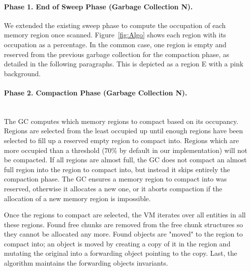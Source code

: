 \documentclass[sigplan,10pt,screen]{acmart}\settopmatter{printfolios=true,printccs=true,printacmref=true}
\newcommand{\egb}[1]{\color{blue}\fbox{\bfseries\sffamily\scriptsize Elisa:}{\sf\small$\blacktriangleright$\textit{#1}$\blacktriangleleft$}\color{black}}
\begin{document}
\paragraph{Phase 1. End of Sweep Phase (Garbage Collection N).} We extended the existing sweep phase to compute the occupation of each memory region once scanned. 
Figure~\ref{fig:Algo} shows each region with its occupation as a percentage. 
In the common case, one region is empty and reserved from the previous garbage collection for the compaction phase, as detailed in the following paragraphs. 
This is depicted as a region E with a pink background.

\paragraph{Phase 2. Compaction Phase (Garbage Collection N).} \hfill \\ 
The GC computes which memory regions to compact based on its occupancy. Regions are selected from the least occupied up until enough regions have been selected to fill up a reserved empty region to compact into. Regions which are more occupied than a threshold (70\% by default in our implementation) will not be compacted.
If all regions are almost full, the GC does not compact an almost full region into the region to compact into, but instead it skips entirely the compaction phase.
The GC ensures a memory region to compact into was reserved, otherwise it allocates a new one, or it aborts compaction if the allocation of a new memory region is impossible.

Once the regions to compact are selected, the VM iterates over all entities in all these regions. Found free chunks are removed from the free chunk structures so they cannot be allocated any more. Found objects are "moved" to the region to compact into; an object is moved by creating a copy of it in the region and mutating the original into a forwarding object pointing to the copy.
Last, the algorithm maintains the forwarding objects invariants.
\end{document}
